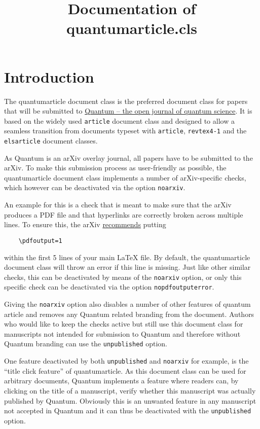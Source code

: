 \documentclass[a4paper,noarxiv,onecolumn]{quantumarticle}
\begin{document}
	\title{Documentation of quantumarticle.cls}
	\maketitle
	
	\tableofcontents
	
	\clearpage
	
	\section{Introduction}
	The quantumarticle document class is the preferred document class for papers that will be submitted to \href{https://quantum-journal.org/}{Quantum -- the open journal of quantum science}. It is based on the widely used \texttt{article} document class and designed to allow a seamless transition from documents typeset with \texttt{article}, \texttt{revtex4-1} and the \texttt{elsarticle} document classes. 
	
	As Quantum is an arXiv overlay journal, all papers have to be submitted to the arXiv. To make this submission process as user-friendly as possible, the quantumarticle document class implements a number of arXiv-specific checks, which however can be deactivated via the option \texttt{noarxiv}.

        An example for this is a check that is meant to make sure that the arXiv produces a PDF file and that hyperlinks are correctly broken across multiple lines.
        To ensure this, the arXiv \href{https://arxiv.org/help/submit_tex}{recommends} putting 
	\begin{verbatim}
	\pdfoutput=1
	\end{verbatim}
	within the first 5 lines of your main LaTeX file. By default, the quantumarticle document class will throw an error if this line is missing. Just like other similar checks, this can be deactivated by means of the \texttt{noarxiv} option, or only this specific check can be deactivated via the option \texttt{nopdfoutputerror}.

        Giving the \texttt{noarxiv} option also disables a number of other features of quantum article and removes any Quantum related branding from the document. Authors who would like to keep the checks active but still use this document class for manuscripts not intended for submission to Quantum and therefore without Quantum branding can use the \texttt{unpublished} option.

        One feature deactivated by both \texttt{unpublished} and \texttt{noarxiv} for example, is the ``title click feature'' of quantumarticle. As this document class can be used for arbitrary documents, Quantum implements a feature where readers can, by clicking on the title of a manuscript, verify whether this manuscript was actually published by Quantum. Obviously this is an unwanted feature in any manuscript not accepted in Quantum and it can thus be deactivated with the \texttt{unpublished} option.
        
\end{document}
